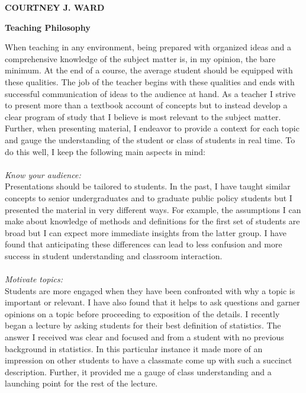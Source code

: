 \documentclass[10.5pt]{article}
\begin{document}
\singlespace

\normalsize{

\hspace{120mm} \textbf{ \normalsize{C}\small{OURTNEY} \normalsize{J.} \normalsize{W}\small{ARD} }
%
%
\begin{center}
\textbf{\large{Teaching Philosophy}}\\
\end{center}
{When teaching in any environment, being prepared with organized ideas and a comprehensive knowledge of the subject matter is, in my opinion, the bare minimum. At the end of a course, the average student should be equipped with these qualities. The job of the teacher begins with these qualities and ends with successful communication of ideas to the audience at hand. As a teacher I strive to present more than a textbook account of concepts but to instead develop a clear program of study that I believe is most relevant to the subject matter. Further, when presenting material, I endeavor to provide a context for each topic and gauge the understanding of the student or class of students in real time. To do this well, I keep the following main aspects in mind:}\\
\\ 
\textit{Know your audience: }\\
{Presentations should be tailored to students. In the past, I have taught similar concepts to senior undergraduates and to graduate public policy students but I presented the material in very different ways. For example, the assumptions I can make about knowledge of methods and definitions for the first set of students are broad but I can expect more immediate insights from the latter group. I have found that anticipating these differences can lead to less confusion and more success in student understanding and classroom interaction.}\\
\\
\textit{Motivate topics: }\\
{Students are more engaged when they have been confronted with why a topic is important or relevant. I have also found that it helps to ask questions and garner opinions on a topic before proceeding to exposition of the details. I recently began a lecture by asking students for their best definition of statistics. The answer I received was clear and focused and from a student with no previous background in statistics. In this particular instance it made more of an impression on other students to have a classmate come up with such a succinct description. Further, it provided me a gauge of class understanding and a launching point for the rest of the lecture.}\\
}
\end{document}
